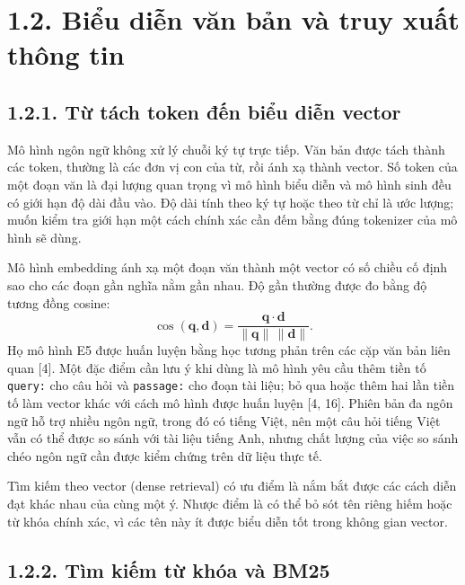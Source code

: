 \section{1.2. Biểu diễn văn bản và truy xuất thông tin}

\subsection{1.2.1. Từ tách token đến biểu diễn vector}

Mô hình ngôn ngữ không xử lý chuỗi ký tự trực tiếp. Văn bản được tách thành các token, thường là các đơn vị con của từ, rồi ánh xạ thành vector. Số token của một đoạn văn là đại lượng quan trọng vì mô hình biểu diễn và mô hình sinh đều có giới hạn độ dài đầu vào. Độ dài tính theo ký tự hoặc theo từ chỉ là ước lượng; muốn kiểm tra giới hạn một cách chính xác cần đếm bằng đúng tokenizer của mô hình sẽ dùng.


Mô hình embedding ánh xạ một đoạn văn thành một vector có số chiều cố định sao cho các đoạn gần nghĩa nằm gần nhau. Độ gần thường được đo bằng độ tương đồng cosine:
\begin{equation*}
\cos(\mathbf{q},\mathbf{d}) = \frac{\mathbf{q}\cdot\mathbf{d}}{\lVert\mathbf{q}\rVert\,\lVert\mathbf{d}\rVert}.
\end{equation*}
Họ mô hình E5 được huấn luyện bằng học tương phản trên các cặp văn bản liên quan [4]. Một đặc điểm cần lưu ý khi dùng là mô hình yêu cầu thêm tiền tố \texttt{query:} cho câu hỏi và \texttt{passage:} cho đoạn tài liệu; bỏ qua hoặc thêm hai lần tiền tố làm vector khác với cách mô hình được huấn luyện [4, 16]. Phiên bản đa ngôn ngữ hỗ trợ nhiều ngôn ngữ, trong đó có tiếng Việt, nên một câu hỏi tiếng Việt vẫn có thể được so sánh với tài liệu tiếng Anh, nhưng chất lượng của việc so sánh chéo ngôn ngữ cần được kiểm chứng trên dữ liệu thực tế.


Tìm kiếm theo vector (dense retrieval) có ưu điểm là nắm bắt được các cách diễn đạt khác nhau của cùng một ý. Nhược điểm là có thể bỏ sót tên riêng hiếm hoặc từ khóa chính xác, vì các tên này ít được biểu diễn tốt trong không gian vector.


\subsection{1.2.2. Tìm kiếm từ khóa và BM25}

